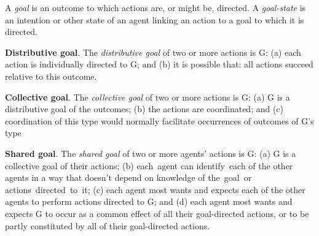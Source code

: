 \documentclass[11pt]{extarticle}
\begin{document}
\begin{multicols}{3}
A \emph{goal} is an outcome to which actions are, or might be, directed.  A \emph{goal-state} is an intention or other state of an agent linking an action to a goal to which it is directed.

\begin{comment}
\begin{center}
  \texttt{[image: standard\_story.png]}
\emph{Figure}: The standard story for individual action.
\end{center}
\end{comment}

\textbf{Distributive goal}.  The \emph{distributive goal} of two or more actions is G: (a) each action is individually directed to G; and (b) it is possible that: all actions succeed relative to this outcome.

\textbf{Collective goal}.  The \emph{collective goal} of two or more actions is G:
(a) G is a distributive goal of the outcomes;
(b) the actions are coordinated; and 
(c) coordination of this type would normally  facilitate occurrences of outcomes of G's type


\textbf{Shared goal}.  The \emph{shared goal} of two or more agents' actions is G: (a) G is a collective goal of their actions; 
(b) each agent can identify each of the other agents in a way that doesn't depend on knowledge of the goal or	 actions directed to it;
(c) each agent most wants and expects each of the other agents to perform actions directed to G; and 
(d) each agent most wants and expects G to occur as a common effect of all their goal-directed actions, or to be partly constituted by all of their goal-directed actions.






\footnotesize 


\end{multicols}
\end{document}
